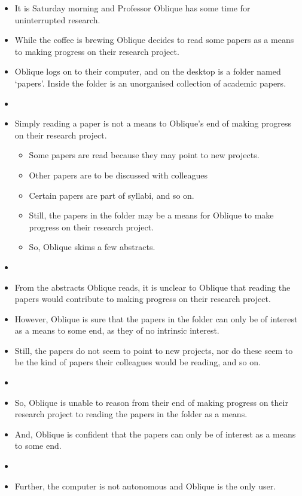 \documentclass[10pt]{article}
\begin{document}
\newpage


\begin{itemize}[noitemsep]
\item It is Saturday morning and Professor Oblique has some time for uninterrupted research.
\item While the coffee is brewing Oblique decides to read some papers as a means to making progress on their research project.
\item Oblique logs on to their computer, and on the desktop is a folder named `papers'. Inside the folder is an unorganised collection of academic papers.
\item[]
\item Simply reading a paper is not a means to Oblique's end of making progress on their research project.
  \begin{itemize}
  \item Some papers are read because they may point to new projects.
  \item Other papers are to be discussed with colleagues
  \item Certain papers are part of syllabi, and so on.
  \item Still, the papers in the folder may be a means for Oblique to make progress on their research project.
  \item So, Oblique skims a few abstracts.
  \end{itemize}
\item[]
\item From the abstracts Oblique reads, it is unclear to Oblique that reading the papers would contribute to making progress on their research project.
\item However, Oblique is sure that the papers in the folder can only be of interest as a means to some end, as they of no intrinsic interest.
\item Still, the papers do not seem to point to new projects, nor do these seem to be the kind of papers their colleagues would be reading, and so on.
\item[]
\item So, Oblique is unable to reason from their end of making progress on their research project to reading the papers in the folder as a means.
\item And, Oblique is confident that the papers can only be of interest as a means to some end.
\item[]
\item Further, the computer is not autonomous and Oblique is the only user.

\end{itemize}
\end{document}
